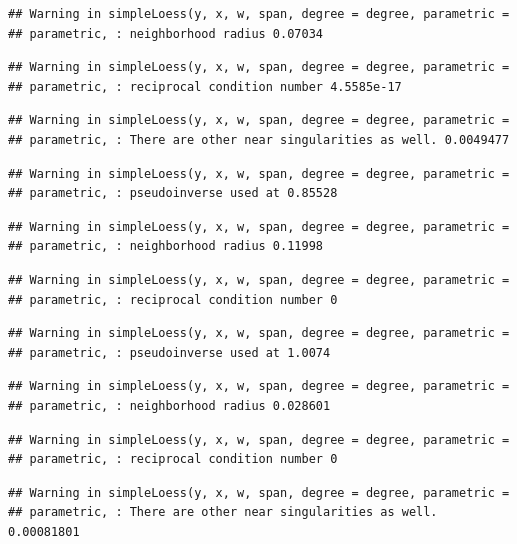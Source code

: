 \documentclass[]{article}
\begin{document}
\begin{verbatim}
## Warning in simpleLoess(y, x, w, span, degree = degree, parametric =
## parametric, : neighborhood radius 0.07034
\end{verbatim}

\begin{verbatim}
## Warning in simpleLoess(y, x, w, span, degree = degree, parametric =
## parametric, : reciprocal condition number 4.5585e-17
\end{verbatim}

\begin{verbatim}
## Warning in simpleLoess(y, x, w, span, degree = degree, parametric =
## parametric, : There are other near singularities as well. 0.0049477
\end{verbatim}

\begin{verbatim}
## Warning in simpleLoess(y, x, w, span, degree = degree, parametric =
## parametric, : pseudoinverse used at 0.85528
\end{verbatim}

\begin{verbatim}
## Warning in simpleLoess(y, x, w, span, degree = degree, parametric =
## parametric, : neighborhood radius 0.11998
\end{verbatim}

\begin{verbatim}
## Warning in simpleLoess(y, x, w, span, degree = degree, parametric =
## parametric, : reciprocal condition number 0
\end{verbatim}

\begin{verbatim}
## Warning in simpleLoess(y, x, w, span, degree = degree, parametric =
## parametric, : pseudoinverse used at 1.0074
\end{verbatim}

\begin{verbatim}
## Warning in simpleLoess(y, x, w, span, degree = degree, parametric =
## parametric, : neighborhood radius 0.028601
\end{verbatim}

\begin{verbatim}
## Warning in simpleLoess(y, x, w, span, degree = degree, parametric =
## parametric, : reciprocal condition number 0
\end{verbatim}

\begin{verbatim}
## Warning in simpleLoess(y, x, w, span, degree = degree, parametric =
## parametric, : There are other near singularities as well. 0.00081801
\end{verbatim}
\end{document}
